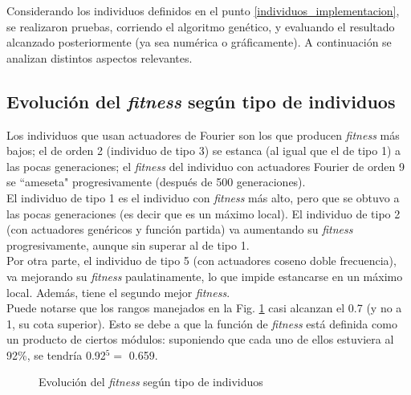 \documentclass{article}
\begin{document}
Considerando los individuos definidos en el punto \ref{individuos_implementacion}, se realizaron pruebas, corriendo el algoritmo gen\'etico, y evaluando el resultado alcanzado posteriormente (ya sea num\'erica o gr\'aficamente). A continuaci\'on se analizan distintos aspectos relevantes. 

\subsection{Evoluci\'on del \textit{fitness} seg\'un tipo de individuos}

Los individuos que usan actuadores de Fourier son los que producen \textit{fitness} m\'as bajos; el de orden 2 (individuo de tipo 3) se estanca (al igual que el de tipo 1) a las pocas generaciones; el \textit{fitness} del individuo con actuadores Fourier de orden 9 se ``ameseta" progresivamente (despu\'es de 500 generaciones).\\
El individuo de tipo 1 es el individuo con \textit{fitness} m\'as alto, pero que se obtuvo a las pocas generaciones (es decir que es un m\'aximo local). El individuo de tipo 2 (con actuadores gen\'ericos y funci\'on partida) va aumentando su \textit{fitness} progresivamente, aunque sin superar al de tipo 1.\\
Por otra parte, el individuo de tipo 5 (con actuadores coseno doble frecuencia), va mejorando su \textit{fitness} paulatinamente, lo que impide estancarse en un m\'aximo local. Adem\'as, tiene el segundo mejor \textit{fitness}.\\
Puede notarse que los rangos manejados en la Fig. \ref{fig:resultados_fitness} casi alcanzan el 0.7 (y no a 1, su cota superior). Esto se debe a que la funci\'on de \textit{fitness} est\'a definida como un producto de ciertos m\'odulos: suponiendo que cada uno de ellos estuviera al 92\%, se tendr\'ia  0.92$^5 =$ 0.659.
\begin{figure}[H]%
  \centering
  \caption{Evoluci\'on del \textit{fitness} seg\'un tipo de individuos}%
  \label{fig:resultados_fitness} %
\end{figure}
\end{document}
